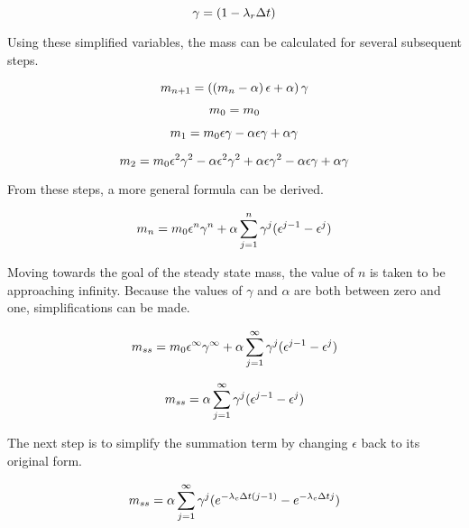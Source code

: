\begin{equation} \hfill
\gamma = \left(1 - {\lambda_r \Delta t} \right)
\hfill \end{equation}

Using these simplified variables, the mass can be calculated for several subsequent steps.

\begin{equation} \hfill
m_{n+1} = \left(\left(m_n - \alpha \right) \epsilon  + \alpha\right) \gamma
\hfill \end{equation}

\begin{equation} \hfill
m_0 = m_0
\hfill \end{equation}

\begin{equation} \hfill
m_1 = m_0 \epsilon \gamma - \alpha \epsilon \gamma + \alpha \gamma
\hfill \end{equation}

\begin{equation} \hfill
m_2 = m_0 \epsilon^2 \gamma^2 - \alpha \epsilon^2 \gamma^2 + \alpha \epsilon \gamma^2 - \alpha \epsilon \gamma + \alpha \gamma
\hfill \end{equation}

From these steps, a more general formula can be derived.

\begin{equation} \hfill
m_n = m_0 \epsilon^n \gamma^n + \alpha \sum_{j=1}^n \gamma^j (\epsilon^{j-1} - \epsilon^j)
\hfill \end{equation}

Moving towards the goal of the steady state mass, the value of $n$ is taken to be approaching infinity. Because the values of $\gamma$ and $\alpha$ are both between zero and one, simplifications can be made.

\begin{equation} \hfill
m_{ss} = m_0 \epsilon^{\infty} \gamma^{\infty} + \alpha \sum_{j=1}^{\infty} \gamma^j (\epsilon^{j-1} - \epsilon^j)
\hfill \end{equation}

\begin{equation} \hfill
m_{ss} = \alpha \sum_{j=1}^{\infty} \gamma^j (\epsilon^{j-1} - \epsilon^j)
\hfill \end{equation}

The next step is to simplify the summation term by changing $\epsilon$ back to its original form.

\begin{equation} \hfill
m_{ss} = \alpha \sum_{j=1}^{\infty} \gamma^j (e^{-\lambda_c \Delta t (j-1)} - e^{-\lambda_c \Delta t j})
\hfill \end{equation}

